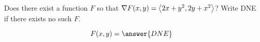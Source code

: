 \documentclass{ximera}
\author{David Guichard \and Neal Koblitz \and H. Jerome Keisler \and Albert Scheller \and Barry Balof \and Mike Wills \and Matthew Carr}
\begin{document}
\begin{exercise}




Does there exist a function $F$ so that $\nabla F(x,y)=\left\langle 2x+y^2,2y+x^2\right\rangle$? Write DNE if there exists no such $F$.

\begin{prompt}
\[
F(x,y)=\answer{DNE}
\]
\end{prompt}
\end{exercise}
\end{document}
